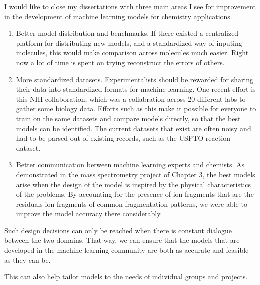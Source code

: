 I would like to close my dissertations with three main areas I see for improvement in the development of machine learning models for chemistry applications.

\begin{enumerate}

\item Better model distribution and benchmarks. If there existed a centralized platform for distributing new models, and a standardized way of inputing molecules, this would make comparison across molecules much easier. Right now a lot of time is spent on trying reconstruct the errors of others.

\item More standardized datasets. Experimentalists should be rewarded for sharing their data into standardized formats for machine learning. One recent effort is this NIH collaboration, which was a collabration across 20 different labs to gather some biology data. Efforts such as this make it possible for everyone to train on the same datasets and compare models directly, so that the best models can be identified. The current datasets that exist are often noisy and had to be parsed out of existing records, such as the USPTO reaction dataset.

\item Better communication between machine learning experts and chemists. As demonstrated in the mass spectrometry project of Chapter 3, the best models arise when the design of the model is inspired by the physical characteristics of the problems. By accounting for the presence of ion fragments that are the residuals ion fragments of common fragmentation patterns, we were able to improve the model accuracy there considerably.

\end{enumerate}

Such design decisions can only be reached when there is constant dialogue between the two domains. That way, we can ensure that the models that are developed in the machine learning community are both as accurate and feasible as they can be.

This can also help tailor models to the needs of individual groups and projects.

